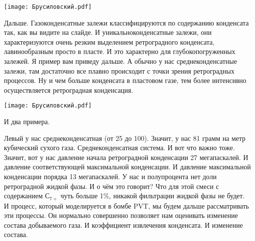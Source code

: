 \documentclass[main.tex]{subfiles}
\begin{document}
\begin{center}
\texttt{[image: Брусиловский.pdf]}
\end{center}

Дальше.
Газоконденсатные залежи классифицируются по содержанию конденсата так, как вы видите на слайде.
И уникальноконденсатные залежи, они характеризуются очень резким выделением ретроградного конденсата, лавинообразным просто в пласте.
И это характерно для глубокопогруженных залежей.
Я пример вам приведу дальше.
А обычно у нас среднеконденсатные залежи, там достаточно все плавно происходит с точки зрения ретроградных процессов.
Ну и чем больше конденсата в пластовом газе, тем более интенсивно осуществляется ретроградная конденсация.

\begin{center}
\texttt{[image: Брусиловский.pdf]}
\end{center}

И два примера.

Левый у нас среднеконденсатная (от 25 до 100).
Значит, у нас 81 грамм на метр кубический сухого газа.
Среднеконденсатная система.
И вот что важно тоже.
Значит, вот у нас давление начала ретроградной конденсации 27 мегапаскалей.
И давление соответствующей максимальной конденсации.
И давление максимальной конденсации порядка 13 мегапаскалей.
У нас и полупроцента нет доли ретроградной жидкой фазы.
И о чём это говорит?
Что для этой смеси с содержанием $С_{7+}$ чуть больше 1\%, никакой фильтрации жидкой фазы не будет.
И процесс, который моделируется в бомбе PVT, мы будем дальше рассматривать эти процессы.
Он нормально совершенно позволяет нам оценивать изменение состава добываемого газа.
И коэффициент извлечения конденсата.
И изменение состава.
\end{document}
